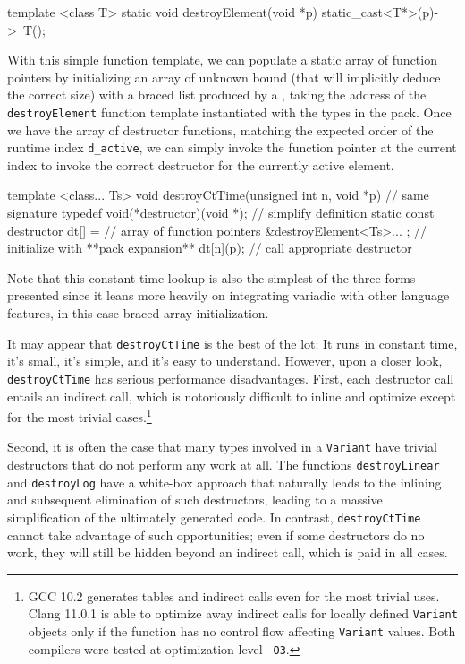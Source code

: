 \begin{emcppslisting}
template <class T>
static void destroyElement(void *p)
{
    static_cast<T*>(p)->~T();
}
\end{emcppslisting}
    

\noindent With this simple function template, we can populate a static array of
function pointers by initializing an array of unknown bound (that will
implicitly deduce the correct size) with a braced list produced by a
, taking the address of the
\lstinline!destroyElement! function template instantiated with the types in
the pack. Once we have the array of destructor functions, matching the
expected order of the runtime index \lstinline!d_active!, we can simply
invoke the function pointer at the current index to invoke the correct
destructor for the currently active element.

\begin{emcppslisting}
template <class... Ts>
void destroyCtTime(unsigned int n, void *p)  // same signature
{
    typedef void(*destructor)(void *);       // simplify definition
    static const destructor dt[] =           // array of function pointers
        { &destroyElement<Ts>... };          // initialize with **pack expansion**
    dt[n](p);                                // call appropriate destructor
}
\end{emcppslisting}
    

\noindent Note that this constant-time lookup is also the simplest of the three
forms presented since it leans more heavily on integrating variadic
 with other language features, in this case
braced array initialization.

It may appear that \lstinline!destroyCtTime! is the best of the lot: It
runs in constant time, it's small, it's simple, and it's easy to
understand. However, upon a closer look, \lstinline!destroyCtTime! has
serious performance disadvantages. First, each destructor call entails
an indirect call, which is notoriously difficult to inline and optimize
except for the most trivial cases.{\cprotect\footnote{GCC 10.2 generates
tables and indirect calls even for the most trivial uses. Clang 11.0.1
is able to optimize away indirect calls for locally defined
\lstinline!Variant! objects only if the function has no control flow
affecting \lstinline!Variant! values. Both compilers were tested at
  optimization level \lstinline!-O3!.}}

Second, it is often the case that many types involved in a
\lstinline!Variant! have trivial destructors that do not perform any work
at all. The functions \lstinline!destroyLinear! and \lstinline!destroyLog!
have a white-box approach that naturally leads to the inlining and
subsequent elimination of such destructors, leading to a massive
simplification of the ultimately generated code. In contrast,
\lstinline!destroyCtTime! cannot take advantage of such opportunities; even
if some destructors do no work, they will still be hidden beyond an
indirect call, which is paid in all cases.

